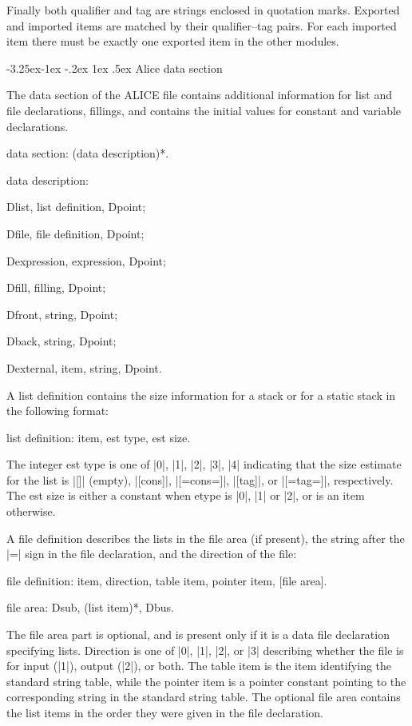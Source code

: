 \documentclass[titlepage]{article}
\makeatletter
\newcommand\I{\textsf{ALICE}}
\newenvironment{grammar}{%
\begin{list}{}{%
\setlength\leftmargin{18pt}%
\setlength\rightmargin{-5pt}%
\setlength\listparindent{20pt}%
\setlength\itemsep{1pt plus0.2ex}%
\setlength\parsep{0pt plus 2pt}%
\setlength\labelsep{-5pt}%
}\color{blue!90!black}\sf\mkoptions%
}{\end{list}}
\newcommand\g[1]{\textsf{\color{blue!90!black}#1}}
\renewcommand\subsection{%
\@startsection{subsection}{2}{\z@}%
   {-3.25ex\@plus -1ex \@minus -.2ex}%
   {1ex \@plus .5ex}%
   {\normalfont\normalsize\bfseries}}
\makeatother
\begin{document}
Finally both \g{qualifier} and \g{tag} are strings enclosed in quotation
marks. Exported and imported items are matched by their qualifier--tag
pairs. For each imported item there must be exactly one exported item in the
other modules.

\subsection{Alice data section}\label{alice:data}

The \g{data section} of the \I{} file contains additional information for 
list and file declarations, fillings, and contains the initial values for 
\g{constant} and \g{variable} declarations. 
\begin{grammar}
\item data section: (data description)*.
\item data description:

            Dlist, list definition, Dpoint;

            Dfile, file definition, Dpoint;

            Dexpression, expression, Dpoint;

            Dfill, filling, Dpoint;

            Dfront, string, Dpoint;

            Dback, string, Dpoint;

            Dexternal, item, string, Dpoint.
\end{grammar}
A \g{list definition} contains the size information for a stack or for a
static stack in the following format:
\begin{grammar}
\item list definition: item, est type, est size.
\end{grammar}
The integer \g{est type} is one of \pp|0|, \pp|1|, \pp|2|, \pp|3|, \pp|4|
indicating that the size estimate for the list is \pp|[]| (empty),
\pp|[cons]|, \pp|[=cons=]|, \pp|[tag]|, or \pp|[=tag=]|, respectively. The
\g{est size} is either a constant when \g{etype} is \pp|0|, \pp|1| or
\pp|2|, or is an \g{item} otherwise.

A \g{file definition} describes the lists in the file area (if present),
the string after the \pp|=| sign in the file declaration, and the direction
of the file:
\begin{grammar}
\item file definition: item, direction, table item, pointer item, [file
area].

\item file area: Dsub, (list item)*, Dbus.
\end{grammar}
The \g{file area} part is optional, and is present only if it is a data file
declaration specifying lists. \g{Direction} is one of \pp|0|, \pp|1|,
\pp|2|, or \pp|3| describing whether the file is for input (\pp|1|), output
(\pp|2|), or both. The \g{table item} is the item identifying the standard
string table, while the \g{pointer item} is a pointer constant pointing to the
corresponding string in the standard string table. The optional \g{file
area} contains the list items in the order they were given in the file
declaration.
\end{document}
